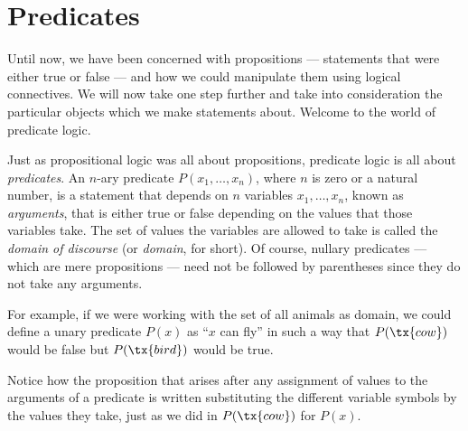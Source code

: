 
\section{Predicates}

\begin{para}
Until now, we have been concerned with propositions --- statements that were either true or false --- and how we could manipulate them using logical connectives.
We will now take one step further and take into consideration the particular objects which we make statements about.
Welcome to the world of predicate logic.
\end{para}

\begin{para}[Predicates]
Just as propositional logic was all about propositions, predicate logic is all about \emph{predicates}.
An $n$-ary predicate $P(x_1,\ldots,x_n)$, where $n$ is zero or a natural number, is a statement that depends on $n$ variables $x_1,\ldots,x_n$, known as \emph{arguments}, that is either true or false depending on the values that those variables take.
The set of values the variables are allowed to take is called the \emph{domain of discourse} (or \emph{domain}, for short).
Of course, nullary predicates --- which are mere propositions --- need not be followed by parentheses since they do not take any arguments.

For example, if we were working with the set of all animals as domain, we could define a unary predicate $P(x)$ as ``$x$ can fly'' in such a way that $P(\tx{cow})$ would be false but $P(\tx{bird})$ would be true.

Notice how the proposition that arises after any assignment of values to the arguments of a predicate is written substituting the different variable symbols by the values they take, just as we did in $P(\tx{cow})$ for $P(x)$.


\end{para}

